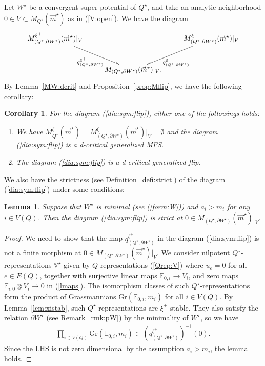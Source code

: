 \documentclass[11pt]{amsart}
\theoremstyle{plain}
\newtheorem{lem}[thm]{Lemma}
\newtheorem{cor}[thm]{Corollary}
\theoremstyle{definition}
\theoremstyle{remark}
\begin{document}
Let $W^{\star}$ be a convergent super-potential of $Q^{\star}$, 
and take an analytic 
neighborhood $0 \in V \subset M_{Q^{\star}}(\vec{m}^{\star})$
as in (\ref{V:open}).
We have the diagram
 \begin{align}\label{dia:sym:flip}
\xymatrix{
M_{(Q^{\star}, \partial W^{\star})}^{\xi^{+}}(\vec{m}^{\star})|_{V} 
\ar[rd]_-{q_{(Q^{\star}, \partial W^{\star})}^{\xi^{+}}} & & 
\ar[dl]^-{q_{(Q^{\star}, \partial W^{\star})}^{\xi^{-}}}
M_{(Q^{\star}, \partial W^{\star})}^{\xi^{-}}(\vec{m}^{\star})|_{V} \\
&  M_{(Q^{\star}, \partial W^{\star})}(\vec{m}^{\star})|_{V}. &
}
\end{align}
By Lemma~\ref{MW:dcrit} and Proposition~\ref{prop:Mflip}, 
we have the following corollary: 
\begin{cor}\label{cor:dflip}
For the diagram (\ref{dia:sym:flip}),
either one of the followings holds:
\begin{enumerate}
\item We have $M_{Q^{\star}}^{\xi^{-}}(\vec{m}^{\star})=M_{(Q^{\star}, \partial W^{\star})}^{\xi^{-}}(\vec{m}^{\star})|_{V}=\emptyset$
and the diagram (\ref{dia:sym:flip}) is a d-critical generalized MFS. 
\item The diagram (\ref{dia:sym:flip}) is a d-critical generalized flip. 
\end{enumerate} 
\end{cor}

We also have the strictness (see Definition~\ref{defi:strict})
of the diagram (\ref{dia:sym:flip})
under some conditions: 
\begin{lem}\label{lem:strict}
Suppose that $W^{\star}$ is minimal (see (\ref{form:W})) and 
$a_i>m_i$ for any $i \in V(Q)$. Then 
the diagram (\ref{dia:sym:flip}) is strict
at $0 \in M_{(Q^{\star}, \partial W^{\star})}(\vec{m}^{\star})|_{V}$. 
\end{lem}
\begin{proof}
We need to show that the map 
$q_{(Q^{\star}, \partial W^{\star})}^{\xi^{+}}$ in the diagram (\ref{dia:sym:flip}) is not a finite morphism
at $0 \in M_{(Q^{\star}, \partial W^{\star})}(\vec{m}^{\star})|_{V}$. 
We consider nilpotent $Q^{\star}$-representations $\mathbb{V}^{\star}$
given by $Q$-representations (\ref{Qrep:V}) where $u_e=0$ for all $e \in E(Q)$, 
together with surjective linear maps 
$\mathbb{E}_{0, i} \to V_i$, and zero maps 
$\mathbb{E}_{i, 0} \otimes V_i \to 0$
in (\ref{lmaps}). 
The isomorphism 
classes of such $Q^{\star}$-representations 
form the product of 
Grassmannians $\mathrm{Gr}(\mathbb{E}_{0, i}, m_i)$
for all $i \in V(Q)$. 
By Lemma~\ref{lem:xistab}, such $Q^{\star}$-representations are 
$\xi^+$-stable. 
They also satisfy the relation $\partial W^{\star}$ (see Remark~\ref{rmk:pW}) 
by the minimality of $W^{\star}$, 
so we have 
\begin{align*}
\prod_{i \in V(Q)} \mathrm{Gr}(\mathbb{E}_{0, i}, m_i) \subset 
\left(q_{(Q^{\star}, \partial W^{\star})}^{\xi^{+}} \right)^{-1}(0). 
\end{align*}
Since the LHS is not zero dimensional 
by the assumption $a_i >m_i$, 
the lemma holds. 
\end{proof}
\end{document}
